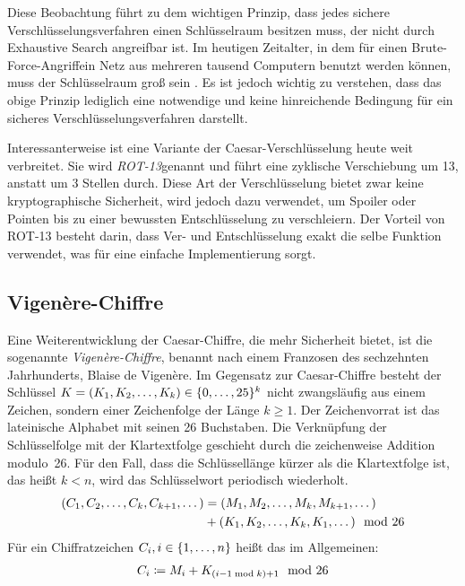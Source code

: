 Diese Beobachtung führt zu dem wichtigen Prinzip, dass jedes sichere
Verschlüsselungsverfahren einen Schlüsselraum besitzen muss, der nicht
durch Exhaustive Search angreifbar ist. Im heutigen Zeitalter, in dem
für einen Brute-Force-Angriff\indexBruteForce ein Netz aus mehreren
tausend Computern benutzt werden können, muss der Schlüsselraum groß
sein \cite{NIST_800_57, Blaze1996}. Es ist jedoch wichtig zu verstehen,
dass das obige Prinzip lediglich eine notwendige und keine hinreichende
Bedingung für ein sicheres Verschlüsselungsverfahren darstellt. 

Interessanterweise ist eine Variante der Caesar-Verschlüsselung heute
weit verbreitet. Sie wird \emph{ROT-13}\indexCaesarROT genannt und
führt eine zyklische Verschiebung um 13, anstatt um 3 Stellen
durch. Diese Art der Verschlüsselung bietet zwar keine kryptographische
Sicherheit, wird jedoch dazu verwendet, um Spoiler oder Pointen bis zu
einer bewussten Entschlüsselung zu verschleiern. Der Vorteil von ROT-13
besteht darin, dass Ver- und Entschlüsselung exakt die selbe Funktion
verwendet, was für eine einfache Implementierung sorgt. 

\subsection{Vigenère-Chiffre}
\label{ssec:vigenere}
Eine Weiterentwicklung der Caesar-Chiffre, die mehr Sicherheit bietet,
ist die sogenannte \emph{Vigenère-Chiffre}\indexVignere, benannt nach
einem Franzosen des sechzehnten Jahrhunderts, Blaise de Vigenère. Im
Gegensatz zur Caesar-Chiffre besteht der Schlüssel $K =
(K_{1},K_{2},\dots,K_{k}) \in \{0,\dots,25\}^{k}$ nicht
zwangsläufig aus einem Zeichen, sondern einer Zeichenfolge der Länge $k
\geq 1$.  Der Zeichenvorrat ist das lateinische Alphabet mit seinen 26
Buchstaben. Die Verknüpfung der Schlüsselfolge mit der Klartextfolge
geschieht durch die zeichenweise Addition modulo~26. Für den Fall, dass
die Schlüssellänge kürzer als die Klartextfolge ist, das heißt $k < n$,
wird das Schlüsselwort periodisch wiederholt.
\begin{align*}
  \begin{split}
    (C_{1},C_{2},\dots,C_{k},C_{k+1},\dots) &= (M_{1},M_{2},\dots,M_{k},M_{k+1},\dots)\\ 
    &+ (K_{1},K_{2},\dots,K_{k},K_{1},\dots) \mod 26
  \end{split}
\end{align*}
Für ein Chiffratzeichen $C_{i}, i \in \{1,\dots,n\}$ heißt das im Allgemeinen:
\begin{align*}
  C_{i} \coloneqq M_{i} + K_{(i-1 \bmod k)+1} \mod 26
\end{align*}

